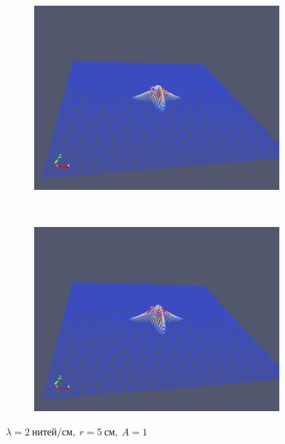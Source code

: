 \begin{figure}[H]
\begin{subfigure}[t]{0.5\textwidth}
        \includegraphics[width=\textwidth]{img/fiber/density_2_radius_5_amplitude_1/5.png}
    \end{subfigure}%
    ~
    \begin{subfigure}[t]{0.5\textwidth}
        \centering
        \includegraphics[width=\textwidth]{img/fiber/density_2_radius_5_amplitude_1/6.png}
    \end{subfigure}
    \caption{$\lambda=2~нитей/см,~r=5~см,~A=1$}
\end{figure}
